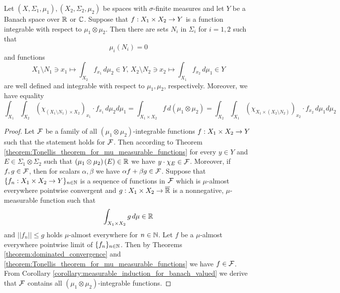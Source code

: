 \begin{theorem}\label{corollary:fubinis_for_integrable}
Let $(X,\Sigma_1,\mu_1), (X_2,\Sigma_2,\mu_2)$ be spaces with $\sigma$-finite measures and let $Y$ be a Banach space over ${\mathbb R}$ or ${\mathbb C}$. Suppose that $f:X_1\times X_2\rightarrow Y$ is a function integrable with respect to $\mu_1\otimes \mu_2$. Then there are sets $N_i$ in $\Sigma_i$ for $i=1,2$ such that
$$\mu_i(N_i) = 0$$ 
and functions
$$X_1\setminus N_1\ni x_1\mapsto \int_{X_2}f_{x_1}\,d\mu_2\in Y,\,X_2\setminus N_2\ni x_2\mapsto \int_{X_1}f_{x_2}\,d\mu_1\in Y$$
are well defined and integrable with respect to $\mu_1, \mu_2$, respectively. Moreover, we have equality
$$\int_{X_1}\int_{X_2} \left(\chi_{\left(X_1\setminus N_1\right)\times X_2}\right)_{x_1}\cdot f_{x_1}\,d\mu_2d\mu_1 = \int_{X_1\times X_2}f\,d(\mu_1\otimes \mu_2) = \int_{X_2}\int_{X_1} \left(\chi_{X_1\times \left(X_2\setminus N_2\right)}\right)_{x_2}\cdot f_{x_2}\,d\mu_1d\mu_2$$
\end{theorem}
\begin{proof}
Let ${\mathcal F}$ be a family of all $\left(\mu_1\otimes \mu_2\right)$-integrable functions $f:X_1\times X_2\rightarrow Y$ such that the statement holds for ${\mathcal F}$. Then according to Theorem \ref{theorem:Tonellis_theorem_for_mu_measurable_functions} for every $y\in Y$ and $E\in \Sigma_1\otimes \Sigma_2$ such that $\left(\mu_1\otimes \mu_2\right)(E) \in {\mathbb R}$ we have $y\cdot \chi_E \in {\mathcal F}$. Moreover, if $f, g\in {\mathcal F}$, then for scalars $\alpha,\beta$ we have $\alpha f + \beta g\in {\mathcal F}$. Suppose that $\{f_n:X_1\times X_2\rightarrow Y\}_{n\in {\mathbb N}}$ is a sequence of functions in ${\mathcal F}$ which is $\mu$-almost everywhere pointwise convergent and $g:X_1\times X_2\rightarrow \overline{{\mathbb R}}$ is a nonnegative, $\mu$-measurable function such that
$$\int_{X_1\times X_2}g\,d\mu \in {\mathbb R}$$
and $||f_n||\leq g$ holds $\mu$-almost everywhere for $n\in {\mathbb N}$. Let $f$ be a $\mu$-almost everywhere pointwise limit of $\{f_n\}_{n\in {\mathbb N}}$. Then by Theorems \ref{theorem:dominated_convergence} and \ref{theorem:Tonellis_theorem_for_mu_measurable_functions} we have $f\in {\mathcal F}$. From Corollary \ref{corollary:measurable_induction_for_banach_valued} we derive that ${\mathcal F}$ contains all $\left(\mu_1\otimes \mu_2\right)$-integrable functions.
\end{proof}




\small



